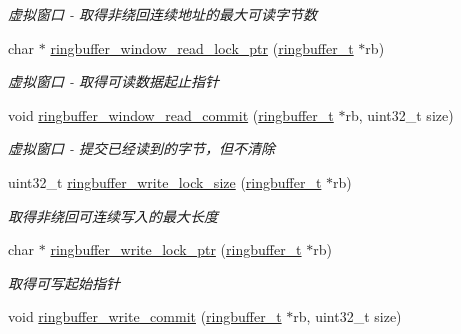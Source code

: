 \begin{DoxyCompactItemize}
\begin{DoxyCompactList}\small\item\em 虚拟窗口 -\/ 取得非绕回连续地址的最大可读字节数 \end{DoxyCompactList}\item 
char $\ast$ \hyperlink{a00084_a2fc4c4b70a7f3959c0c82c99432ed04d_a2fc4c4b70a7f3959c0c82c99432ed04d}{ringbuffer\+\_\+window\+\_\+read\+\_\+lock\+\_\+ptr} (\hyperlink{a00051_af929c5cf86b6a0f64dde407dfe60482e_af929c5cf86b6a0f64dde407dfe60482e}{ringbuffer\+\_\+t} $\ast$rb)
\begin{DoxyCompactList}\small\item\em 虚拟窗口 -\/ 取得可读数据起止指针 \end{DoxyCompactList}\item 
void \hyperlink{a00084_a5bccc516abce64ee739ed00bf055d42e_a5bccc516abce64ee739ed00bf055d42e}{ringbuffer\+\_\+window\+\_\+read\+\_\+commit} (\hyperlink{a00051_af929c5cf86b6a0f64dde407dfe60482e_af929c5cf86b6a0f64dde407dfe60482e}{ringbuffer\+\_\+t} $\ast$rb, uint32\+\_\+t size)
\begin{DoxyCompactList}\small\item\em 虚拟窗口 -\/ 提交已经读到的字节，但不清除 \end{DoxyCompactList}\item 
uint32\+\_\+t \hyperlink{a00084_ada2b3f0cea4e372229709a5cb1f54725_ada2b3f0cea4e372229709a5cb1f54725}{ringbuffer\+\_\+write\+\_\+lock\+\_\+size} (\hyperlink{a00051_af929c5cf86b6a0f64dde407dfe60482e_af929c5cf86b6a0f64dde407dfe60482e}{ringbuffer\+\_\+t} $\ast$rb)
\begin{DoxyCompactList}\small\item\em 取得非绕回可连续写入的最大长度 \end{DoxyCompactList}\item 
char $\ast$ \hyperlink{a00084_a67c7cbb3e39d70fc9ef3e4938fbc6d1d_a67c7cbb3e39d70fc9ef3e4938fbc6d1d}{ringbuffer\+\_\+write\+\_\+lock\+\_\+ptr} (\hyperlink{a00051_af929c5cf86b6a0f64dde407dfe60482e_af929c5cf86b6a0f64dde407dfe60482e}{ringbuffer\+\_\+t} $\ast$rb)
\begin{DoxyCompactList}\small\item\em 取得可写起始指针 \end{DoxyCompactList}\item 
void \hyperlink{a00084_a88804c221b00561ac45b12b6e54bb8d1_a88804c221b00561ac45b12b6e54bb8d1}{ringbuffer\+\_\+write\+\_\+commit} (\hyperlink{a00051_af929c5cf86b6a0f64dde407dfe60482e_af929c5cf86b6a0f64dde407dfe60482e}{ringbuffer\+\_\+t} $\ast$rb, uint32\+\_\+t size)

\end{DoxyCompactItemize}
